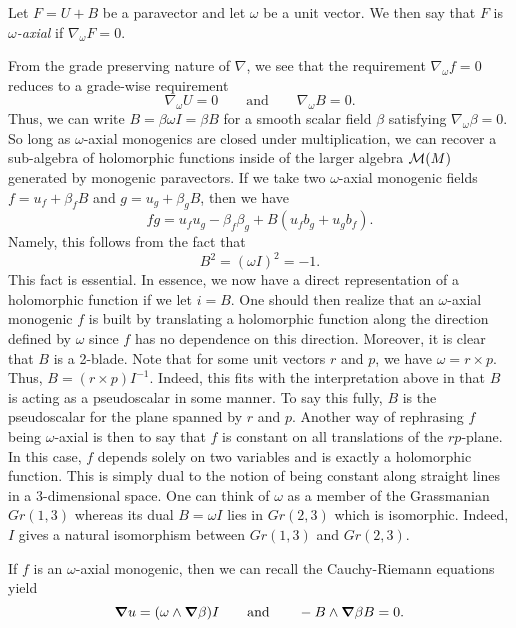 \documentclass[12pt]{article}
\begin{document}
\begin{definition}
    Let $F=U+B$ be a paravector and let $\omega$ be a unit vector.  We then say that $F$ is \emph{$\omega$-axial} if $\nabla_\omega F = 0$.  
\end{definition}


From the grade preserving nature of $\nabla$, we see that the requirement $\nabla_\omega f=0$ reduces to a grade-wise requirement
\[
\nabla_\omega U = 0 \qquad \textrm{and} \qquad \nabla_\omega B = 0.
\]
Thus, we can write $B=\beta \omega I = \beta B$ for a smooth scalar field $\beta$ satisfying $\nabla_\omega \beta =0$. So long as $\omega$-axial monogenics are closed under multiplication, we can recover a sub-algebra of holomorphic functions inside of the larger algebra $\mathcal{M}(M)$ generated by monogenic paravectors. If we take two $\omega$-axial monogenic fields $f=u_f + \beta_f B$ and $g=u_g + \beta_g B$, then we have
\begin{equation}
\label{eq:axial_multiplication}
fg = u_f u_g - \beta_f \beta_g + B (u_f b_g + u_g b_f).
\end{equation}
Namely, this follows from the fact that
\[
B^2 = (\omega I)^2 = -1.
\]
This fact is essential. In essence, we now have a direct representation of a holomorphic function if we let $i=B$.  One should then realize that an $\omega$-axial monogenic $f$ is built by translating a holomorphic function along the direction defined by $\omega$ since $f$ has no dependence on this direction. Moreover, it is clear that $B$ is a 2-blade.  Note that for some unit vectors $r$ and $p$, we have $\omega = r \times p$.  Thus, $B =  (r \times p)I^{-1}$.  Indeed, this fits with the interpretation above in that $B$ is acting as a pseudoscalar in some manner.  To say this fully, $B$ is the pseudoscalar for the plane spanned by $r$ and $p$. Another way of rephrasing $f$ being $\omega$-axial is then to say that $f$ is constant on all translations of the $r p$-plane. In this case, $f$ depends solely on two variables and is exactly a holomorphic function. This is simply dual to the notion of being constant along straight lines in a 3-dimensional space.  One can think of $\omega$ as a member of the Grassmanian $Gr(1,3)$ whereas its dual $B=\omega I$ lies in $Gr(2,3)$ which is isomorphic. Indeed, $I$ gives a natural isomorphism between $Gr(1,3)$ and $Gr(2,3)$.

If $f$ is an $\omega$-axial monogenic, then we can recall the Cauchy-Riemann equations yield
\begin{equation}
\label{eq:axial_cauchy_riemann}
\boldsymbol{\nabla} u = (\omega \wedge \boldsymbol{\nabla} \beta)I \qquad \textrm{and} \qquad - B \wedge \boldsymbol{\nabla} \beta B = 0.
\end{equation}
\end{document}
